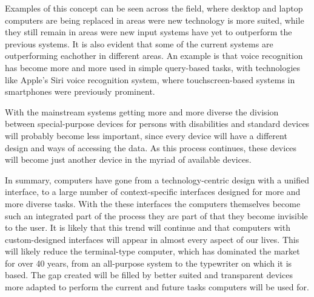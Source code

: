 Examples of this concept can be seen across the field, where desktop and laptop computers are being replaced in areas were new technology is more suited, while they still remain in areas were new input systems have yet to outperform the previous systems. It is also evident that some of the current systems are outperforming eachother in different areas. An example is that voice recognition has become more and more used in simple query-based tasks, with technologies like Apple's Siri voice recognition system, where touchscreen-based systems in smartphones were previously prominent.

With the mainstream systems getting more and more diverse the division between special-purpose devices for persons with disabilities and standard devices will probably become less important, since every device will have a different design and ways of accessing the data. As this process continues, these devices will become just another device in the myriad of available devices.

In summary, computers have gone from a technology-centric design with a unified interface, to a large number of context-specific interfaces designed for more and more diverse tasks. With the these interfaces the computers themselves become such an integrated part of the process they are part of that they become invisible to the user. It is likely that this trend will continue and that computers with custom-designed interfaces will appear in almost every aspect of our lives. This will likely reduce the terminal-type computer, which has dominated the market for over 40 years, from an all-purpose system to the typewriter on which it is based. The gap created will be filled by better suited and transparent devices more adapted to perform the current and future tasks computers will be used for.